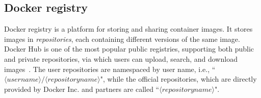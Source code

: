 









\subsection{Docker registry}
\label{sec:docker-registry}

Docker registry is a platform for storing and sharing container
images. It stores images in \emph{repositories}, each containing
different versions of the same image.
%
Docker Hub is one of the most popular public registries,
supporting both public and private repositories,
via which users can upload, search, and download images~\cite{docker-hub}.
%
%
%
%
%
%
The user repositories are namespaced by user name, i.e.,
``$\langle username\rangle/\langle repository name \rangle$",
while the official repositories, which
are directly provided by Docker Inc. and partners are called
``$\langle repository name \rangle$".
%



